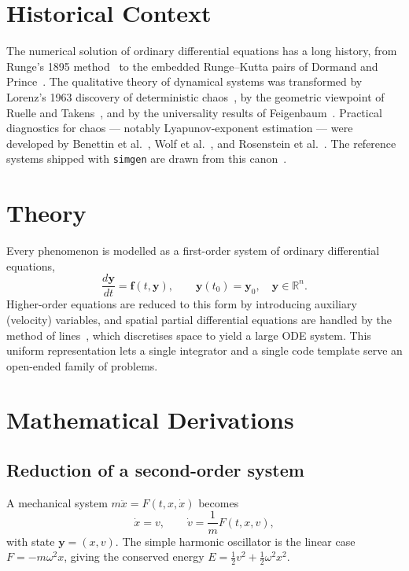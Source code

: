 \documentclass[11pt,a4paper]{article}
\begin{document}
\section{Historical Context}
The numerical solution of ordinary differential equations has a long history,
from Runge's 1895 method~\cite{runge1895} to the embedded Runge--Kutta pairs of
Dormand and Prince~\cite{dormand1980}. The qualitative theory of dynamical
systems was transformed by Lorenz's 1963 discovery of deterministic
chaos~\cite{lorenz1963}, by the geometric viewpoint of Ruelle and
Takens~\cite{ruelle1971}, and by the universality results of
Feigenbaum~\cite{feigenbaum1978}. Practical diagnostics for chaos --- notably
Lyapunov-exponent estimation --- were developed by Benettin et
al.~\cite{benettin1980}, Wolf et al.~\cite{wolf1985}, and Rosenstein et
al.~\cite{rosenstein1993}. The reference systems shipped with \texttt{simgen}
are drawn from this canon~\cite{strogatz2015,guckenheimer1983}.

\section{Theory}
Every phenomenon is modelled as a first-order system of ordinary differential
equations,
\begin{equation}
  \frac{d\mathbf{y}}{dt} = \mathbf{f}(t, \mathbf{y}), \qquad
  \mathbf{y}(t_0) = \mathbf{y}_0, \quad \mathbf{y} \in \mathbb{R}^n .
\end{equation}
Higher-order equations are reduced to this form by introducing auxiliary
(velocity) variables, and spatial partial differential equations are handled by
the method of lines~\cite{leveque2007}, which discretises space to yield a large
ODE system. This uniform representation lets a single integrator and a single
code template serve an open-ended family of problems.

\section{Mathematical Derivations}
\subsection{Reduction of a second-order system}
A mechanical system $m\ddot{x} = F(t, x, \dot{x})$ becomes
\begin{equation}
  \dot{x} = v, \qquad \dot{v} = \frac{1}{m} F(t, x, v),
\end{equation}
with state $\mathbf{y} = (x, v)$. The simple harmonic oscillator is the linear
case $F = -m\omega^2 x$, giving the conserved energy
$E = \tfrac{1}{2}v^2 + \tfrac{1}{2}\omega^2 x^2$.
\end{document}
